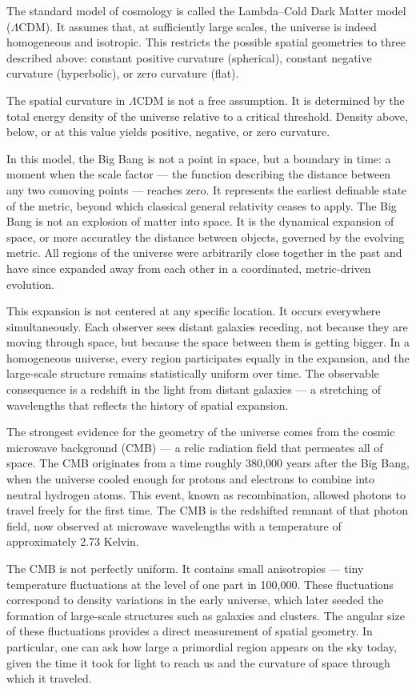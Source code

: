 The standard model of cosmology is called the Lambda–Cold Dark Matter model ($\Lambda$CDM). It assumes that, at sufficiently large scales, the universe is indeed homogeneous and isotropic. This restricts the possible spatial geometries to three described above: constant positive curvature (spherical), constant negative curvature (hyperbolic), or zero curvature (flat). 

The spatial curvature in $\Lambda$CDM is not a free assumption. It is determined by the total energy density of the universe relative to a critical threshold. Density above, below, or at this value yields positive, negative, or zero curvature.

In this model, the Big Bang is not a point in space, but a boundary in time: a moment when the scale factor — the function describing the distance between any two comoving points — reaches zero. It represents the earliest definable state of the metric, beyond which classical general relativity ceases to apply. The Big Bang is not an explosion of matter into space. It is the dynamical expansion of space, or more accuratley the distance between objects, governed by the evolving metric. All regions of the universe were arbitrarily close together in the past and have since expanded away from each other in a coordinated, metric-driven evolution.

This expansion is not centered at any specific location. It occurs everywhere simultaneously. Each observer sees distant galaxies receding, not because they are moving through space, but because the space between them is getting bigger. In a homogeneous universe, every region participates equally in the expansion, and the large-scale structure remains statistically uniform over time. The observable consequence is a redshift in the light from distant galaxies — a stretching of wavelengths that reflects the history of spatial expansion.

The strongest evidence for the geometry of the universe comes from the cosmic microwave background (CMB) — a relic radiation field that permeates all of space. The CMB originates from a time roughly 380,000 years after the Big Bang, when the universe cooled enough for protons and electrons to combine into neutral hydrogen atoms. This event, known as recombination, allowed photons to travel freely for the first time. The CMB is the redshifted remnant of that photon field, now observed at microwave wavelengths with a temperature of approximately 2.73 Kelvin.

The CMB is not perfectly uniform. It contains small anisotropies — tiny temperature fluctuations at the level of one part in 100,000. These fluctuations correspond to density variations in the early universe, which later seeded the formation of large-scale structures such as galaxies and clusters. The angular size of these fluctuations provides a direct measurement of spatial geometry. In particular, one can ask how large a primordial region appears on the sky today, given the time it took for light to reach us and the curvature of space through which it traveled.

